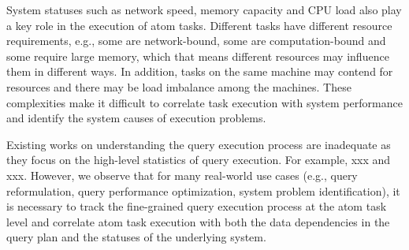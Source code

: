  System statuses such as network speed, memory capacity and CPU load also play a key role in the execution of atom tasks. Different tasks have different resource requirements, e.g., some are network-bound, some are computation-bound and some require large memory, which that means different resources may influence them in different ways. In addition, tasks on the same machine may contend for resources and there may be load imbalance among the machines. These complexities make it difficult to correlate task execution with system performance and identify the system causes of execution problems.     


Existing works on understanding the query execution process are inadequate as they focus on the high-level statistics of query execution. For example, xxx and xxx. However, we observe that for many real-world use cases (e.g., query reformulation, query performance optimization, system problem identification), it is necessary to track the fine-grained query execution process at the atom task level and correlate atom task execution with both the data dependencies in the query plan and the statuses of the underlying system.           



